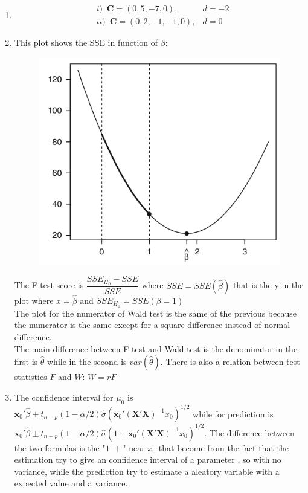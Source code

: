 \documentclass[10pt,a4paper]{article}
\author{Michele De Vita}
\begin{document}
	\begin{enumerate}
		\item  
		\begin{align*}
	 &i) \,\,\, \mathbf{C} = (0,  5, -7, 0), &d = -2  \\
		& ii) \,\,\, \mathbf{C} = (0, 2, -1, -1, 0),  &d=0 
		\end{align*}
		\item 
		This plot shows the SSE in function of $ \beta $:
		\begin{figure}[H]
			\centering
			\includegraphics[width=0.7\linewidth]{plot_ftest}
		\end{figure}
		The F-test score is $ \dfrac{SSE_{H_0} - SSE}{SSE} $ where $ SSE = SSE(\hat{\beta}) $ that is the y in the plot where $ x = \hat{\beta} $ and $ SSE_{H_0} = SSE(\beta = 1) $\\
		The plot for the numerator of Wald test is the same of the previous because the numerator is the same except for a square difference instead of normal difference.\\
		The main difference between F-test and Wald test is the denominator in the first is $ \hat{\theta} $ while in the second is $ var(\hat{\theta}) $. There is also a relation between test statistics $ F $ and $ W $: $ W = rF $
		\item The confidence interval for $ \mu_0  $ is $ \mathbf{x}_0' \hat{\beta} \pm t_{n-p}(1-\alpha / 2) \hat{\sigma} (\mathbf{x}_0' (\mathbf{X'X})^{-1} x_0)^{1/2}$ while for prediction is $ \mathbf{x}_0' \hat{\beta} \pm t_{n-p}(1-\alpha / 2) \hat{\sigma} (1 + \mathbf{x}_0' (\mathbf{X'X})^{-1} x_0)^{1/2}$. The difference between the two formulas is the "$ 1\,\,+ $" near $ x_0 $ that become from the fact that the estimation try to give an confidence interval of a parameter , so with no variance, while the prediction try to estimate a aleatory variable with a expected value and a variance.

\end{enumerate}
\end{document}
